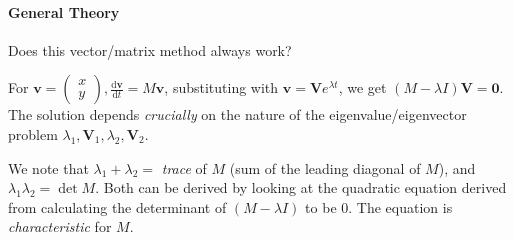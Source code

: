 \documentclass[12pt]{report}
\theoremstyle{definition}
\begin{document}
\paragraph{General Theory}
Does this vector/matrix method always work?

For $\mathbf{v} = \begin{pmatrix}
        x \\
        y
\end{pmatrix} , \frac{\mathrm{d}\mathbf{v}}{\mathrm{d}t} = M\mathbf{v}$,
substituting with $\mathbf{v} = \mathbf{V}e^{\lambda t}$,
we get $(M - \lambda I)\mathbf{V} = \mathbf{0}$.
The solution depends \emph{crucially} on the nature of the eigenvalue/eigenvector problem
$\lambda_1, \mathbf{V}_1, \lambda_2, \mathbf{V}_2$.

We note that $\lambda_1 + \lambda_2 =$ \emph{trace} of $M$ (sum of the leading diagonal of $M$),
and $\lambda_1\lambda_2 = \det{M}$. Both can be derived by looking at the quadratic equation
derived from calculating the determinant of $(M - \lambda I)$ to be $0$.
The equation is \emph{characteristic} for $M$.
\end{document}
